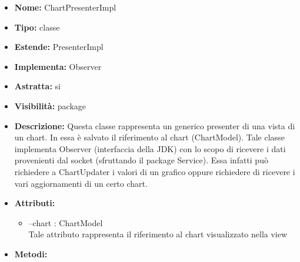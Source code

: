 			
			\begin{itemize}
			\item \textbf{Nome:} ChartPresenterImpl
			\item \textbf{Tipo:} classe
			
		\item \textbf{Estende:}
		PresenterImpl
		\item \textbf{Implementa:}
		Observer
		\item \textbf{Astratta:}
		si
			\item \textbf{Visibilità:} package
			\item \textbf{Descrizione:} Questa classe rappresenta un generico presenter di una vista di un chart. In essa è salvato il riferimento al chart (ChartModel). Tale classe implementa Observer (interfaccia della JDK) con lo scopo di ricevere i dati provenienti dal socket (sfruttando il package Service). Essa infatti può richiedere a ChartUpdater i valori di un grafico oppure richiedere di ricevere i vari aggiornamenti di un certo chart.
			\item \textbf{Attributi:}
				\begin{itemize}
				\setlength{\itemsep}{5pt}
				
					\item[\ding{111}] {--chart : ChartModel} \\ [1mm] Tale attributo rappresenta il riferimento al chart visualizzato nella view
				\end{itemize}
		
			\item \textbf{Metodi:}
				\begin{itemize}
				\setlength{\itemsep}{5pt}
				

\end{itemize}
\end{itemize}
